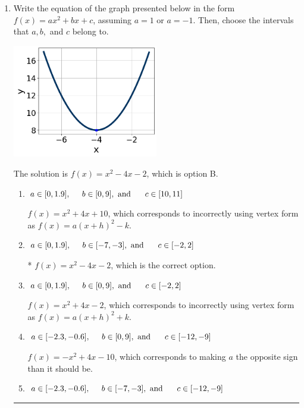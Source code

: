 \documentclass{extbook}[14pt]
\newcommand{\litem}[1]{\item #1

\rule{\textwidth}{0.4pt}}
\begin{document}
\begin{enumerate}\litem{
Write the equation of the graph presented below in the form $f(x)=ax^2+bx+c$, assuming  $a=1$ or $a=-1$. Then, choose the intervals that $a, b,$ and $c$ belong to.

\begin{center}
    \includegraphics[width=0.5\textwidth]{../Figures/quadraticGraphToEquationCopyC.png}
\end{center}


The solution is \( f(x) = x^{2} -4 x -2 \), which is option B.\begin{enumerate}[label=\Alph*.]
\item \( a \in [0, 1.9], \hspace*{5mm} b \in [0, 9], \text{ and } \hspace*{5mm} c \in [10, 11] \)

$f(x)=x^{2} +4 x + 10$, which corresponds to incorrectly using vertex form as $f(x) = a(x+h)^2 - k$.
\item \( a \in [0, 1.9], \hspace*{5mm} b \in [-7, -3], \text{ and } \hspace*{5mm} c \in [-2, 2] \)

* $f(x)=x^{2} -4 x -2$, which is the correct option.
\item \( a \in [0, 1.9], \hspace*{5mm} b \in [0, 9], \text{ and } \hspace*{5mm} c \in [-2, 2] \)

$f(x)=x^{2} +4 x -2$, which corresponds to incorrectly using vertex form as $f(x) = a(x+h)^2+k$.
\item \( a \in [-2.3, -0.6], \hspace*{5mm} b \in [0, 9], \text{ and } \hspace*{5mm} c \in [-12, -9] \)

$f(x)=-x^{2} +4 x -10$, which corresponds to making $a$ the opposite sign than it should be.
\item \( a \in [-2.3, -0.6], \hspace*{5mm} b \in [-7, -3], \text{ and } \hspace*{5mm} c \in [-12, -9] \)


\end{enumerate}}
\end{enumerate}
\end{document}
